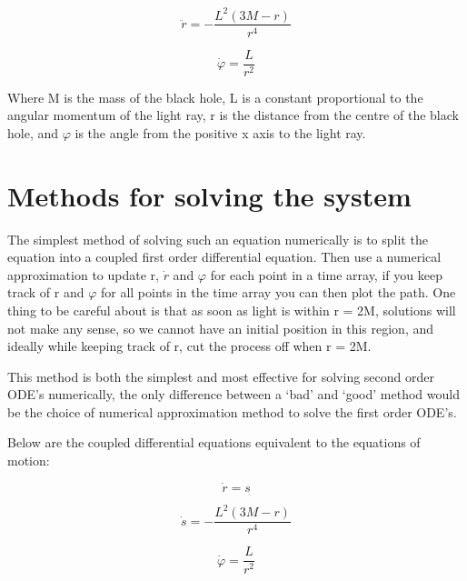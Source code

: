 \documentclass[oneside,openright,frontopenright]{dmathesis}
\begin{document}
	\[\ddot{r}=-\frac{L^2(3M-r)}{r^4}\]

	\[\dot{\varphi}=\frac{L}{r^2}\]


	Where M is the mass of the black hole, L is a constant proportional to the angular momentum of the light ray, r is the distance from the centre of the black hole, and $\varphi$ is the angle from the positive x axis to the light ray.

\section{Methods for solving the system}
	The simplest method of solving such an equation numerically is to split the equation into a coupled first order differential equation. Then use a numerical approximation to update r, $\dot{r}$ and $\varphi$ for each point in a time array, if you keep track of r and $\varphi$ for all points in the time array you can then plot the path. One thing to be careful about is that as soon as light is within r = 2M, solutions will not make any sense, so we cannot have an initial position in this region, and ideally while keeping track of r, cut the process off when r = 2M.

	This method is both the simplest and most effective for solving second order ODE’s numerically, the only difference between a ‘bad’ and ‘good’ method would be the choice of numerical approximation method to solve the first order ODE’s.

	Below are the coupled differential equations equivalent to the equations of motion:

	\[\dot{r}= s\]

	\[\dot{s}=-\frac{L^2(3M-r)}{r^4}\]

	\[\dot{\varphi}=\frac{L}{r^2}\]
\end{document}
